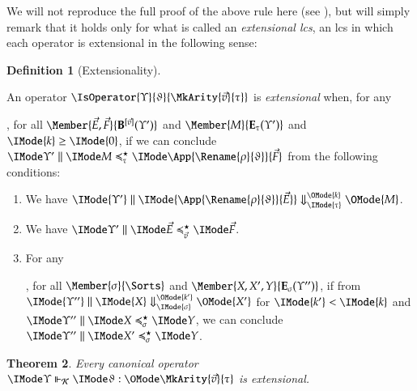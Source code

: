 \documentclass[11pt]{article}
\newtheorem{thm}{Theorem}[section]
\theoremstyle{definition}
\newtheorem{definition}[thm]{Definition}
\theoremstyle{notation}
\theoremstyle{remark}
\numberwithin{equation}{section}
\newcommand\EvalN[5]{\IMode{#1}\parallel\IMode{#4}\Downarrow^{\OMode{#3}}_{\IMode{#2}}\OMode{#5}}
\newcommand\Exprs{\mathbf{E}}
\newcommand\BTms{\mathbf{B}}
\begin{document}
We will not reproduce the full proof of the above rule here (see
\cite{howe:1989}), but will simply remark that it holds only for what is called
an \emph{extensional lcs}, an lcs in which each operator is extensional in the
following sense:

\begin{definition}[Extensionality]
  \label{def:extensionality}

  An operator $\IsOperator{\Upsilon}{\vartheta}{\MkArity{\vec{v}}{\tau}}$ is
  \emph{extensional} when, for any
  , for all $\Member{\vec{E},\vec{F}}{\BTms^{[\vec{v}]}(\Upsilon')}$ and
  $\Member{M}{\Exprs_\tau(\Upsilon')}$ and $\IMode{k}\geq\IMode{0}$, if we can conclude
  $\SBinRel{\preccurlyeq^\star_\tau}{\Upsilon'}{M}{\App{\Rename{\rho}{\vartheta}}{\vec{F}}}$
  from the following conditions:
  \begin{enumerate}
    \item
      We have $\EvalN{\Upsilon'}{\tau}{k}{\App{\Rename{\rho}{\vartheta}}{\vec{E}}}{M}$.

    \item
      We have $\SBinRel{\preccurlyeq^\star_{\vec{v}}}{\Upsilon'}{\vec{E}}{\vec{F}}$.

    \item
      For any
      , for all $\Member{\sigma}{\Sorts}$ and $\Member{X,X',Y}{\Exprs_\sigma(\Upsilon'')}$, if
      from $\EvalN{\Upsilon''}{\sigma}{k'}{X}{X'}$ for $\IMode{k'}<\IMode{k}$ and
      $\SBinRel{\preccurlyeq^\star_\sigma}{\Upsilon''}{X}{Y}$, we can conclude
      $\SBinRel{\preccurlyeq^\star_\sigma}{\Upsilon''}{X'}{Y}$.
  \end{enumerate}

\end{definition}

\begin{thm}
  Every canonical operator
  $\IsCanOperator{\Upsilon}{\vartheta}{\MkArity{\vec{v}}{\tau}}$ is
  extensional.
\end{thm}
\end{document}
